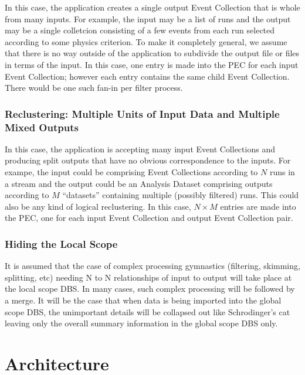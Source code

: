 \documentclass[pdftex]{cmspaper}
\begin{document}
{In this case, the application creates a single output Event Collection
that is whole from many inputs.  For example, the input may be a list
of runs and the output may be a single colletcion consisting of a few
events from each run selected according to some physics criterion.
To make it completely general, we assume that there is no way outside
of the application to subdivide the output file or files in terms of
the input.  In this case, one entry is made into the PEC for each input
Event Collection; however each entry contains the same child Event
Collection. There would be one such fan-in per filter process.

\subsubsection{Reclustering: Multiple Units of Input Data and Multiple Mixed Outputs}

In this case, the application is accepting many input Event Collections
and producing split outputs that have no obvious correspondence to the
inputs.  For exampe, the input could be comprising Event Collections
according to $N$ runs in a stream and the output could be an Analysis
Dataset comprising outputs according to $M$ ``datasets'' containing
multiple (possibly filtered) runs.  This could also be any kind of logical
reclustering.  In this case, $N \times M$ entries are made into the PEC,
one for each input Event Collection and output Event Collection pair.

\subsubsection{Hiding the Local Scope}

It is assumed that the case of complex processing gymnastics (filtering,
skimming, splitting, etc) needing N to N relationships of input to output
will take place at the local scope DBS.  In many cases, such complex
processing will be followed by a merge.  It will be the case that when
data is being imported into the global scope DBS, the unimportant details
will be collapsed out like Schrodinger's cat leaving only the overall
summary information in the global scope DBS only.


\section{Architecture}

}
\end{document}
